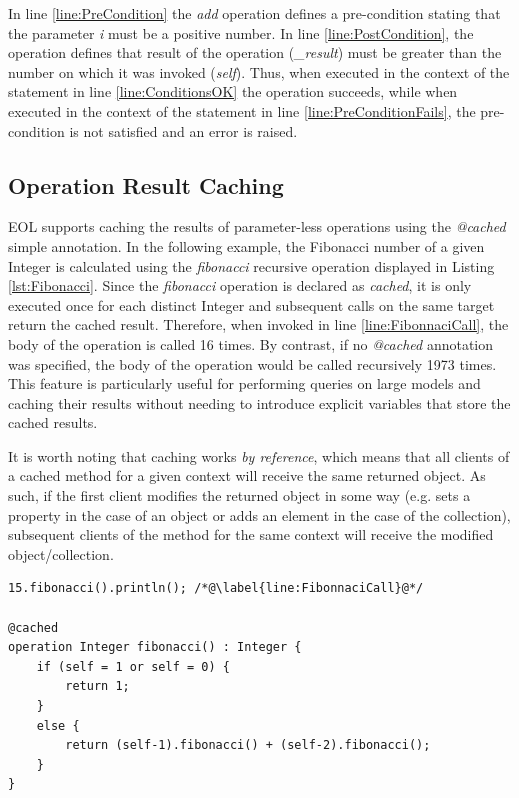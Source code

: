 In line \ref{line:PreCondition} the \emph{add} operation defines a pre-condition stating that the parameter \emph{i} must be a positive number. In line \ref{line:PostCondition}, the operation defines that result of the operation (\emph{\_result}) must be greater than the number on which it was invoked (\emph{self}). Thus, when executed in the context of the statement in line \ref{line:ConditionsOK} the operation succeeds, while when executed in the context of the statement in line \ref{line:PreConditionFails}, the pre-condition is not satisfied and an error is raised. 

\subsection{Operation Result Caching}
\label{sec:EolCaching}

EOL supports caching the results of parameter-less operations using the \emph{@cached} simple annotation. In the following example, the Fibonacci number of a given Integer is calculated using the \emph{fibonacci} recursive operation displayed in Listing \ref{lst:Fibonacci}. Since the \emph{fibonacci} operation is declared as \emph{cached}, it is only executed once for each distinct Integer and subsequent calls on the same target return the cached result. Therefore, when invoked in line \ref{line:FibonnaciCall}, the body of the operation is called 16 times. By contrast, if no \emph{@cached} annotation was specified, the body of the operation would be called recursively 1973 times. This feature is particularly useful for performing queries on large models and caching their results without needing to introduce explicit variables that store the cached results. 

It is worth noting that caching works \emph{by reference}, which means that all clients of a cached method for a given context will receive the same returned object. As such, if the first client modifies the returned object in some way (e.g. sets a property in the case of an object or adds an element in the case of the collection), subsequent clients of the method for the same context will receive the modified object/collection.

\begin{lstlisting}[float=bp, caption=Calculating the Fibonacci number using a cached operation, label=lst:Fibonacci, language=EOL]
15.fibonacci().println(); /*@\label{line:FibonnaciCall}@*/

@cached
operation Integer fibonacci() : Integer {
	if (self = 1 or self = 0) {
		return 1;
	}
	else {
		return (self-1).fibonacci() + (self-2).fibonacci();
	}
}
\end{lstlisting}

